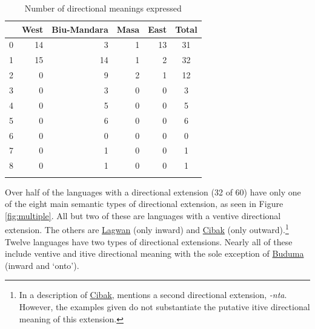 \begin{table}
	\caption{Number of directional meanings expressed}
	\label{tab:multiple}
	\begin{tabular}{rrrrrc}
		\lsptoprule
{} &  West &  Biu-Mandara &  Masa &  East &  Total \\
\midrule
0 &    14 &            3 &     1 &    13 &     31 \\
1 &    15 &           14 &     1 &     2 &     32 \\
2 &     0 &            9 &     2 &     1 &     12 \\
3 &     0 &            3 &     0 &     0 &      3 \\
4 &     0 &            5 &     0 &     0 &      5 \\
5 &     0 &            6 &     0 &     0 &      6 \\
6 &     0 &            0 &     0 &     0 &      0 \\
7 &     0 &            1 &     0 &     0 &      1 \\
8 &     0 &            1 &     0 &     0 &      1 \\
		\lspbottomrule
	\end{tabular}
\end{table}

Over half of the languages with a directional extension (32 of 60) have only one of the eight main semantic types of directional extension, as seen in Figure \ref{fig:multiple}. All but two of these are languages with a ventive directional extension. The others are \hyperref[lagw]{Lagwan} (only inward) and \hyperref[ciba]{Cibak} (only outward).\footnote{In a description of \hyperref[ciba]{Cibak}, \citet{hoffmannZurSpracheCibak1955} mentions a second directional extension, \textit{-nta}. However, the examples given do not substantiate the putative itive directional meaning of this extension.} Twelve languages have two types of directional extensions. Nearly all of these include ventive and itive directional meaning with the sole exception of \hyperref[budu]{Buduma} (inward and `onto'). 

